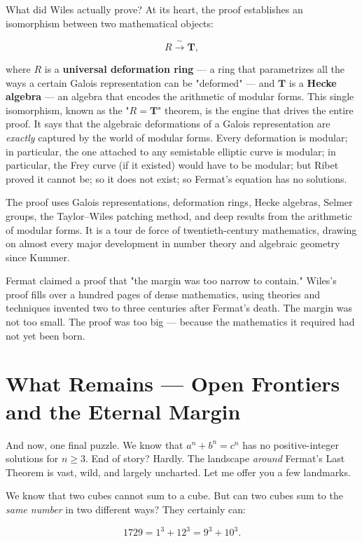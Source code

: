 \documentclass[11pt,twoside,openright]{book}
\theoremstyle{definition}
\theoremstyle{remark}
\begin{document}
What did Wiles actually prove? At its heart, the proof establishes an isomorphism between two mathematical objects:

\[R \xrightarrow{\;\sim\;} \mathbf{T},\]

where $R$ is a \textbf{universal deformation ring} --- a ring that parametrizes all the ways a certain Galois representation can be "deformed" --- and $\mathbf{T}$ is a \textbf{Hecke algebra} --- an algebra that encodes the arithmetic of modular forms. This single isomorphism, known as the "$R = \mathbf{T}$" theorem, is the engine that drives the entire proof. It says that the algebraic deformations of a Galois representation are \textit{exactly} captured by the world of modular forms. Every deformation is modular; in particular, the one attached to any semistable elliptic curve is modular; in particular, the Frey curve (if it existed) would have to be modular; but Ribet proved it cannot be; so it does not exist; so Fermat's equation has no solutions.

The proof uses Galois representations, deformation rings, Hecke algebras, Selmer groups, the Taylor--Wiles patching method, and deep results from the arithmetic of modular forms. It is a tour de force of twentieth-century mathematics, drawing on almost every major development in number theory and algebraic geometry since Kummer.



Fermat claimed a proof that "the margin was too narrow to contain." Wiles's proof fills over a hundred pages of dense mathematics, using theories and techniques invented two to three centuries after Fermat's death. The margin was not too small. The proof was too big --- because the mathematics it required had not yet been born.


\section{What Remains --- Open Frontiers and the Eternal Margin}

And now, one final puzzle. We know that $a^n + b^n = c^n$ has no positive-integer solutions for $n \ge 3$. End of story? Hardly. The landscape \textit{around} Fermat's Last Theorem is vast, wild, and largely uncharted. Let me offer you a few landmarks.

We know that two cubes cannot sum to a cube. But can two cubes sum to the \textit{same number} in two different ways? They certainly can:

\[1729 = 1^3 + 12^3 = 9^3 + 10^3.\]
\end{document}
